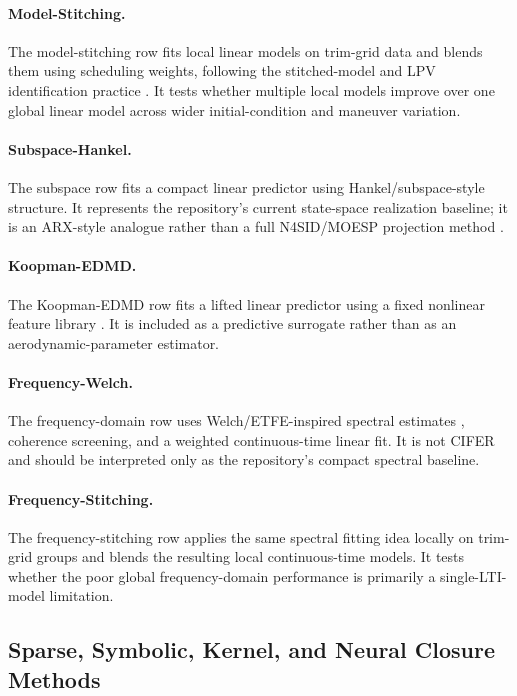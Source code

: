 \documentclass[11pt]{article}
\begin{document}
\paragraph{Model-Stitching.}
The model-stitching row fits local linear models on trim-grid data and blends them using scheduling weights, following the stitched-model and LPV identification practice \cite{Tischler1995SystemIM,toth2010lpv}. It tests whether multiple local models improve over one global linear model across wider initial-condition and maneuver variation.

\paragraph{Subspace-Hankel.}
The subspace row fits a compact linear predictor using Hankel/subspace-style structure. It represents the repository's current state-space realization baseline; it is an ARX-style analogue rather than a full N4SID/MOESP projection method \cite{VanOverscheeDeMoor1996,verhaegen1992subspace,HOKALMAN+1966+545+548}.

\paragraph{Koopman-EDMD.}
The Koopman-EDMD row fits a lifted linear predictor using a fixed nonlinear feature library \cite{koopman1931hamiltonian,williams2015data,schmid2010dmd}. It is included as a predictive surrogate rather than as an aerodynamic-parameter estimator.

\paragraph{Frequency-Welch.}
The frequency-domain row uses Welch/ETFE-inspired spectral estimates \cite{welch1967use}, coherence screening, and a weighted continuous-time linear fit. It is not CIFER \cite{Tischler1995SystemIM} and should be interpreted only as the repository's compact spectral baseline.

\paragraph{Frequency-Stitching.}
The frequency-stitching row applies the same spectral fitting idea locally on trim-grid groups and blends the resulting local continuous-time models. It tests whether the poor global frequency-domain performance is primarily a single-LTI-model limitation.

\subsection{Sparse, Symbolic, Kernel, and Neural Closure Methods}
\end{document}
